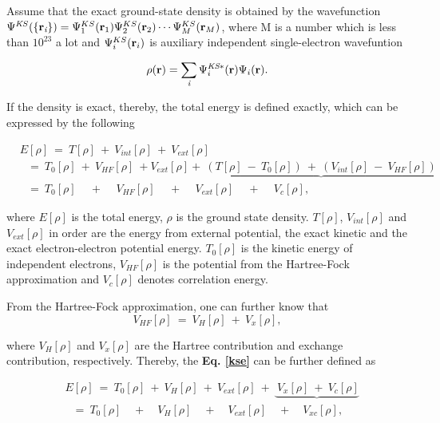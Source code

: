 \documentclass[a4paper, 12pt, titlepage,oneside,drop]{kthesis}
\begin{document}
Assume that the exact ground-state density is obtained by the wavefunction $\wfks = \bwf<1><1> \bwf<2><2> \cdots \bwf<M><M>$, where M is a number which is 
less than $10^{23}$ a lot and $\bwf<i><i>$ is auxiliary independent single-electron wavefuntion

\begin{equation}\label{ks1}
 \rho(\textbf{r}) = \sumi<i> {\Psi^{\textit{KS}*}_{i}(\textbf{r})} {\Psi_{i}(\textbf{r})}.
\end{equation}

If the density is exact, thereby, the total energy is defined exactly, which can be expressed by the following

\begin{equation}\label{kse}
\begin{split}
&E[\rho] \ =\ T[\rho] \ + \ V_\textit{int}[\rho] \ + \ V_\textit{ext}[\rho]  \\
&\ \ \   = \ T_{0}[\rho] \ + \ V_\textit{HF}[\rho] \ + V_\textit{ext}[\rho]+\underbrace{\ (T[\rho] \ - \ T_{0}[\rho]) \ + \  (V_\textit{int}[\rho] \ - \ V_\textit{HF}[\rho])\ }       \\
&\ \ \   = \ T_{0}[\rho] \quad \,  + \quad \,  V_\textit{HF}[\rho] \quad \, + \quad \, V_\textit{ext}[\rho] \quad \, + \quad \, V_\textit{c}[\rho],
\end{split}
\end{equation}

where $E[\rho]$  is the total energy, $\rho$ is the ground state density. $T[\rho]$, $V_\textit{int}[\rho]$ and $V_\textit{ext}[\rho]$ in order are the energy from external potential, the exact kinetic 
and the exact electron-electron potential energy. $T_{0}[\rho]$ is the kinetic energy of independent electrons, $V_\textit{HF}[\rho]$ is the potential from the Hartree-Fock approximation and $V_\textit{c}[\rho]$
denotes correlation energy.

From the Hartree-Fock approximation, one can further know that
\begin{equation}
 V_\textit{HF}[\rho] \ = \ V_\textit{H}[\rho] \ + \ V_\textit{x}[\rho], 
\end{equation}

where $V_\textit{H}[\rho]$ and $ V_\textit{x}[\rho] $ are the Hartree contribution and exchange contribution, respectively. Thereby, the \textbf{Eq. \ref{kse}} can be further defined as

\begin{equation}\label{ccc}
\begin{split}
&E[\rho]\ = \ T_{0}[\rho] \ + \ V_\textit{H}[\rho] \ + \ V_\textit{ext}[\rho] \ + \ \underbrace{\ V_\textit{x}[\rho]  \ + \ V_\textit{c}[\rho]}  \\
&\ \ \ = \ T_{0}[\rho] \quad + \quad V_\textit{H}[\rho] \quad + \quad V_\textit{ext}[\rho] \quad + \quad V_\textit{xc}[\rho],
\end{split}\end{equation}
\end{document}
